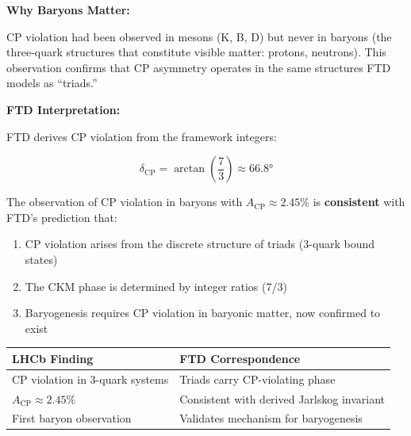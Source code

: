 \documentclass[
  11pt,
  letterpaper,
  twoside,
  openany]{book}
\providecommand{\tightlist}{%
  \setlength{\itemsep}{0pt}\setlength{\parskip}{0pt}}
\begin{document}
\textbf{Why Baryons Matter:}

CP violation had been observed in mesons (K, B, D) but never in baryons
(the three-quark structures that constitute visible matter: protons,
neutrons). This observation confirms that CP asymmetry operates in the
same structures FTD models as ``triads.''

\textbf{FTD Interpretation:}

FTD derives CP violation from the framework integers:

\[\delta_{\text{CP}} = \arctan\left(\frac{7}{3}\right) \approx 66.8°\]

The observation of CP violation in baryons with
\(A_{\text{CP}} \approx 2.45\%\) is \textbf{consistent} with FTD's
prediction that:

\begin{enumerate}
\def\labelenumi{\arabic{enumi}.}
\tightlist
\item
  CP violation arises from the discrete structure of triads (3-quark
  bound states)
\item
  The CKM phase is determined by integer ratios (7/3)
\item
  Baryogenesis requires CP violation in baryonic matter, now confirmed
  to exist
\end{enumerate}

\begin{longtable}[]{@{}
  >{\raggedright\arraybackslash}p{}
  >{\raggedright\arraybackslash}p{}@{}}
\toprule\noalign{}
\begin{minipage}[b]{\linewidth}\raggedright
LHCb Finding
\end{minipage} & \begin{minipage}[b]{\linewidth}\raggedright
FTD Correspondence
\end{minipage} \\
\midrule\noalign{}
\endhead
\bottomrule\noalign{}
\endlastfoot
CP violation in 3-quark systems & Triads carry CP-violating phase \\
\(A_{\text{CP}} \approx 2.45\%\) & Consistent with derived Jarlskog
invariant \\
First baryon observation & Validates mechanism for baryogenesis \\
\end{longtable}
\end{document}

